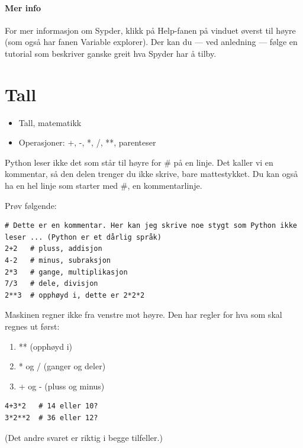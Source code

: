 \paragraph*{Mer info}
For mer informasjon om Sypder, klikk på Help-fanen på vinduet øverst til høyre (som også har fanen Variable explorer). Der kan du --- ved anledning --- følge en tutorial som beskriver ganske greit hva Spyder har å tilby.

\section{Tall}

\begin{usnintro}
\begin{itemize}
\item Tall, matematikk
\item Operasjoner: +, -, *, /, **, parenteser
\end{itemize}
\end{usnintro}

\begin{usncomment}
Python leser ikke det som står til høyre for \# på en linje. Det kaller vi en kommentar, så den delen trenger du ikke skrive, bare mattestykket. Du kan også ha en hel linje som starter med \#, en kommentarlinje.
\end{usncomment}

Prøv følgende:

\begin{lstlisting}
# Dette er en kommentar. Her kan jeg skrive noe stygt som Python ikke leser ... (Python er et dårlig språk)
2+2   # pluss, addisjon
4-2   # minus, subraksjon
2*3   # gange, multiplikasjon
7/3   # dele, divisjon
2**3  # opphøyd i, dette er 2*2*2
\end{lstlisting}

Maskinen regner ikke fra venstre mot høyre. Den har regler for hva som skal regnes ut først:
\begin{enumerate}
\item ** (opphøyd i)
\item * og / (ganger og deler)
\item + og - (pluss og minus)
\end{enumerate}

\begin{lstlisting}
4+3*2   # 14 eller 10? 
3*2**2  # 36 eller 12?
\end{lstlisting}

(Det andre svaret er riktig i begge tilfeller.)

